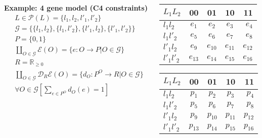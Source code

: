\begin{frame}
\begin{columns}[c]
\begin{column}{0.6\textwidth}
\begin{block}{\textbf{Example: 4 gene model (C4 constraints)}}
\begin{equation*}
\begin{aligned}
& L \in \mathcal{P}(L) = \{l_1,l_2,l'_1,l'_2\}\\
& \mathcal{G} = \{\{l_1,l_2 \},\{l_1,l'_2 \},\{l'_1,l_2\},\{l'_1,l'_2\} \}\\
& P = \{0,1\}\\
& \coprod_{O \in \mathcal{G}} \mathcal{E}(O) = \{e \colon O \rightarrow P | O \in \mathcal{G} \}\\
& R = \mathbb{R}_{\geq 0}\\
& \coprod_{O \in \mathcal{G}} \mathcal{D}_R\mathcal{E}(O) = \{d_O \colon P^O \rightarrow R | O \in \mathcal{G} \}\\
& \forall O \in \mathcal{G} \left[ \sum_{e \in P^O} d_O(e) = 1 \right]
\end{aligned}
\end{equation*}
\end{block}
\end{column}
\begin{column}{0.4\textwidth}
\begin{table}
\centering
\begin{tabular}{ l || c | c | c | r }
$L_1 L_2$  &    00 & 01 & 10 & 11\\ \hline
$l_1 l_2$ & $e_1$ & $e_2$ & $e_3$ & $e_4$\\ \hline
$l_1 l'_2$ & $e_5$ & $e_6$ & $e_7$ & $e_8$\\ \hline
$l'_1 l_2$ & $e_9$ & $e_{10}$ & $e_{11}$ & $e_{12}$\\ \hline
$l'_1 l'_2$ & $e_{13}$ & $e_{14}$ & $e_{15}$ & $e_{16}$\\
\hline
\end{tabular}
\end{table}

\begin{table}
\centering
\begin{tabular}{ l || c | c | c | r }
$L_1 L_2$  &    00 & 01 & 10 & 11\\ \hline
$l_1 l_2$ & $p_1$ & $p_2$ & $p_3$ & $p_4$\\ \hline
$l_1 l'_2$ & $p_5$ & $p_6$ & $p_7$ & $p_8$\\ \hline
$l'_1 l_2$ & $p_9$ & $p_{10}$ & $p_{11}$ & $p_{12}$\\ \hline
$l'_1 l'_2$ & $p_{13}$ & $p_{14}$ & $p_{15}$ & $p_{16}$\\
\hline
\end{tabular}
\end{table}
\end{column}
\end{columns}
\end{frame}
